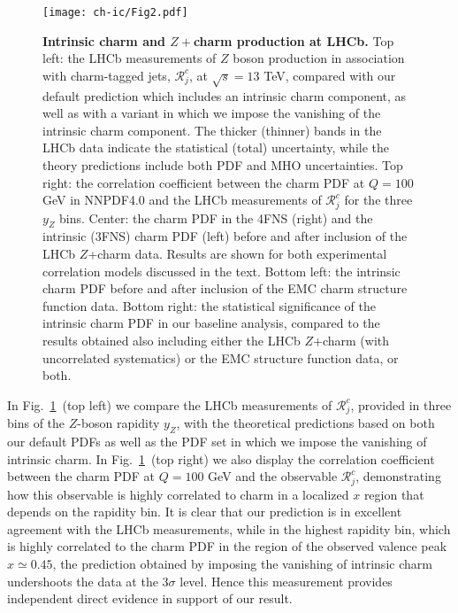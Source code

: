 \begin{figure}[htbp]
  \begin{center}
    \texttt{[image: ch-ic/Fig2.pdf]}
     \caption{\small
       \textbf{ Intrinsic charm and $Z+$charm production at LHCb.}
       Top left: the LHCb measurements of $Z$ boson production
      in association with charm-tagged jets, $\mathcal{R}_j^c$, at $\sqrt{s}=13$ TeV,  compared with
      our default prediction which includes an intrinsic charm component,
      as well as with a variant in which we impose the
      vanishing of the intrinsic charm component.
       The thicker (thinner) bands in the LHCb data indicate the statistical
      (total) uncertainty, while the theory predictions include both PDF and MHO uncertainties.
      Top right: the correlation coefficient between
     the  charm PDF at $Q=100$ GeV in NNPDF4.0
      and the LHCb measurements of $\mathcal{R}_j^c$ 
     for the three $y_Z$ bins.
     Center: the charm PDF
     in the 4FNS (right) and the intrinsic (3FNS) charm PDF (left)
     before and after inclusion of the LHCb $Z$+charm data.
     Results are shown
     for both experimental correlation models discussed in the text.
     Bottom left: the intrinsic charm PDF before and after inclusion
     of the EMC charm structure function data.
     Bottom right: the statistical significance of the
     intrinsic charm PDF in our baseline analysis, compared to the results
     obtained also including either the LHCb $Z$+charm (with uncorrelated
     systematics) or the EMC
     structure function data, or both.
  \label{fig:ic/Zc} }
\end{center}
\end{figure}

In Fig.~\ref{fig:ic/Zc}~(top left) we compare the LHCb measurements of $\mathcal{R}_j^c$, provided
in three bins of the $Z$-boson rapidity
$y_Z$, with the theoretical predictions
 based on both our default PDFs as well as the PDF set in
 which we impose the vanishing of intrinsic charm.
 In Fig.~\ref{fig:ic/Zc}~(top right)
we also display the  correlation coefficient between
 the  charm PDF at $Q=100$ GeV 
 and the observable  $\mathcal{R}_j^c$, demonstrating how this observable
 is highly
 correlated to charm in a localized
 $x$ region that depends on the rapidity bin.
 It is clear that
 our prediction is in excellent agreement with the LHCb measurements, while in the
 highest rapidity bin, which is highly correlated to the charm PDF in
 the region of the observed valence peak $x\simeq 0.45$, the prediction
 obtained by imposing the vanishing of intrinsic charm undershoots the
 data at the $3\sigma$ level.
%
 Hence this measurement provides
 independent direct evidence in support of our result.

